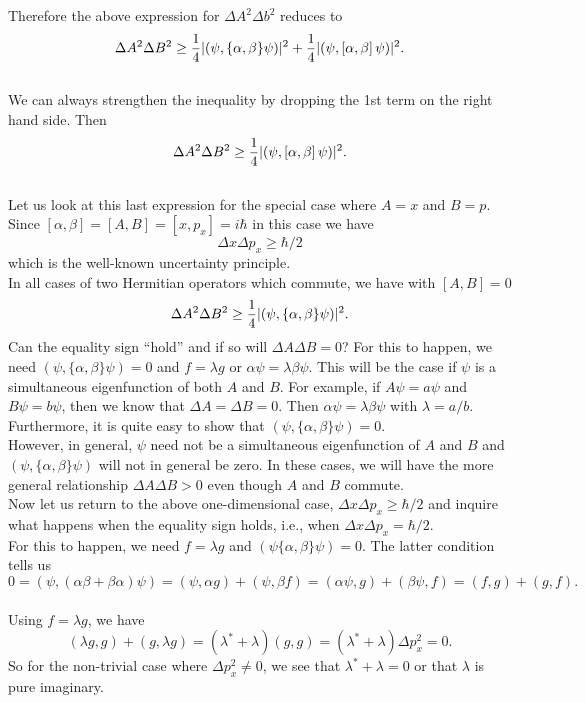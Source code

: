     Therefore the above expression for $\Delta A^2\Delta b^2$ reduces to 
   $$ \Delta A^2 \Delta B^2 \ge {1\over 4} |(\psi,\{ \alpha, \beta\}\psi)|^2 + {1\over4}|(\psi, \left[ \alpha,\beta\right]\psi)|^2.$$\\
   We can always strengthen the inequality by dropping the 1st term on the right hand side. Then
   $$\Delta A^2 \Delta B^2 \ge {1\over 4} |(\psi, \left[ \alpha,\beta\right]\psi)|^2.$$\\
   Let us look at this last expression for the special case where $A=x$ and $B=p$.\\
   Since $\left[\alpha,\beta\right] = \left[A,B\right] = \left[x,p_x\right] = i\hbar$ in this case we have
   $$\Delta x\Delta p_x \ge \hbar/2$$ which is the well-known uncertainty principle. \\
   In all cases of two Hermitian operators which commute, we have with $\left[A,B\right] = 0$ 
   $$\Delta A^2 \Delta B^2 \ge {1\over4}| (\psi,\{\alpha,\beta\}\psi)|^2.$$
   Can the equality sign ``hold'' and if so will $\Delta A\Delta B = 0$? For this to happen, we need $(\psi,\{\alpha,\beta\}\psi) = 0$ and $f = \lambda g$ or $\alpha \psi = \lambda \beta \psi$. This will be the case if
   $\psi$ is  a simultaneous eigenfunction of both $A$ and $B$. For example, if $A\psi = a\psi$ and $B\psi =b\psi$, then we know that $\Delta A = \Delta B = 0$. Then $\alpha \psi = \lambda\beta\psi$ with
   $\lambda = a/b$. Furthermore, it is quite easy to show that $(\psi,\{\alpha,\beta\}\psi) = 0$. \\
   However, in general, $\psi$ need not be a simultaneous eigenfunction of $A$ and $B$ and $(\psi,\{\alpha,\beta\}\psi)$ will not in general be zero. In these cases, we will have the more general 
   relationship $\Delta A\Delta B >0$ even though $A$  and $B$ commute. \\
   Now let us return to the above one-dimensional case, $\Delta x \Delta p_x \ge \hbar/2$ and inquire what happens when the equality sign holds, i.e., when $\Delta x\Delta p_x = \hbar/2$.\\   
   For this to happen, we need $f=\lambda g$ and $(\psi\{\alpha,\beta\}\psi) = 0$. The latter condition tells us 
   \[ 0 = (\psi,(\alpha\beta + \beta\alpha)\psi) = (\psi,\alpha g) + (\psi,\beta f) = (\alpha\psi,g) + (\beta\psi,f) = (f,g) + (g,f).\]\\
   Using $f=\lambda g$, we have
   \[ (\lambda g,g) + (g,\lambda g) = (\lambda^* + \lambda) (g,g) = (\lambda^* + \lambda)\Delta p_x^2 = 0.\]
   So for the non-trivial case where $\Delta p_x^2 \ne 0$, we see that $\lambda^* + \lambda = 0$ or that $\lambda$ is pure imaginary. \\
